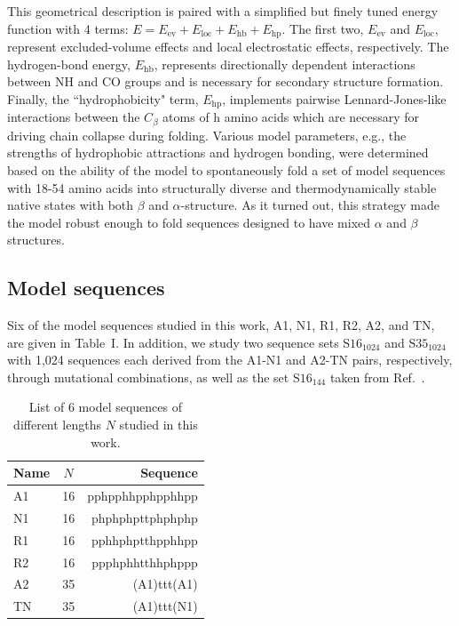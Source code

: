 \documentclass[
aip,
rsi,%
amsmath,amssymb,
reprint,%
]{revtex4-1}
\begin{document}
This geometrical description is paired with a simplified but finely tuned energy function with 4 terms: $E= E_\mathrm{ev} + E_\mathrm{loc} + E_\mathrm{hb} + E_\mathrm{hp}$. The first two, $E_\mathrm{ev}$ and $E_\mathrm{loc}$, represent excluded-volume effects and local electrostatic effects, respectively. The hydrogen-bond energy, $E_\mathrm{hb}$, represents directionally dependent interactions between NH and CO groups and is necessary for secondary structure formation. Finally, the ``hydrophobicity" term, $E_\mathrm{hp}$, implements pairwise Lennard-Jones-like interactions between the $C_\beta$ atoms of h amino acids which are necessary for driving chain collapse during folding. Various model parameters, e.g., the strengths of hydrophobic attractions and hydrogen bonding, were determined based on the ability of the model to spontaneously fold a set of model sequences with 18-54 amino acids into  structurally diverse and thermodynamically stable native states with both $\beta$ and $\alpha$-structure. As it turned out, this strategy made the model robust enough to fold sequences designed to have mixed $\alpha$ and $\beta$ structures. 

\subsection{Model sequences}
\noindent
Six of the model sequences studied in this work, A1, N1, R1, R2, A2, and TN, are given in Table~I. In addition, we study two sequence sets $\mathrm{S16}_{1024}$  and $\mathrm{S35}_{1024}$ with 1,024 sequences each derived from the A1-N1 and A2-TN pairs, respectively, through mutational combinations, as well as the set $\mathrm{S16}_{144}$ taken from  Ref.~\protect{}. 
 
\begin{table}
\caption{\label{tab1} List of 6 model sequences of different lengths $N$ studied in this work.}
\begin{ruledtabular}
\begin{tabular}{lcr}
Name & $N$ & Sequence \\
\hline
A1 & 16 & pphpphhpphpphhpp \\
N1 & 16 & phphphpttphphphp \\
R1 & 16 & pphhphptthpphhpp\\
R2 & 16 & ppphphhtthhphppp\\
A2 & 35 & (A1)ttt(A1)\\
TN & 35 & (A1)ttt(N1)\\
\end{tabular}
\end{ruledtabular}
\end{table}
\end{document}
